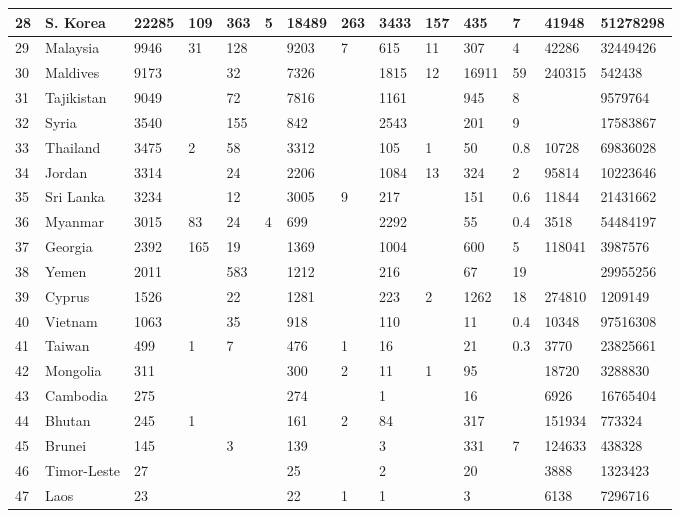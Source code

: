 \begin{landscape}
\begin{footnotesize}
\begin{longtable}{ | l | l | l | l | l | l | l | l | l | l | l | l | l | l | }
	28 & S. Korea & 22285 & 109 & 363 & 5 & 18489 & 263 & 3433 & 157 & 435 & 7 & 41948 & 51278298 \\ \hline
	29 & Malaysia & 9946 & 31 & 128 &  & 9203 & 7 & 615 & 11 & 307 & 4 & 42286 & 32449426 \\ \hline
	30 & Maldives & 9173 &  & 32 &  & 7326 &  & 1815 & 12 & 16911 & 59 & 240315 & 542438 \\ \hline
	31 & Tajikistan & 9049 &  & 72 &  & 7816 &  & 1161 &  & 945 & 8 &  & 9579764 \\ \hline
	32 & Syria & 3540 &  & 155 &  & 842 &  & 2543 &  & 201 & 9 &  & 17583867 \\ \hline
	33 & Thailand & 3475 & 2 & 58 &  & 3312 &  & 105 & 1 & 50 & 0.8 & 10728 & 69836028 \\ \hline
	34 & Jordan & 3314 &  & 24 &  & 2206 &  & 1084 & 13 & 324 & 2 & 95814 & 10223646 \\ \hline
	35 & Sri Lanka & 3234 &  & 12 &  & 3005 & 9 & 217 &  & 151 & 0.6 & 11844 & 21431662 \\ \hline
	36 & Myanmar & 3015 & 83 & 24 & 4 & 699 &  & 2292 &  & 55 & 0.4 & 3518 & 54484197 \\ \hline
	37 & Georgia & 2392 & 165 & 19 &  & 1369 &  & 1004 &  & 600 & 5 & 118041 & 3987576 \\ \hline
	38 & Yemen & 2011 &  & 583 &  & 1212 &  & 216 &  & 67 & 19 &  & 29955256 \\ \hline
	39 & Cyprus & 1526 &  & 22 &  & 1281 &  & 223 & 2 & 1262 & 18 & 274810 & 1209149 \\ \hline
	40 & Vietnam & 1063 &  & 35 &  & 918 &  & 110 &  & 11 & 0.4 & 10348 & 97516308 \\ \hline
	41 & Taiwan & 499 & 1 & 7 &  & 476 & 1 & 16 &  & 21 & 0.3 & 3770 & 23825661 \\ \hline
	42 & Mongolia & 311 &  &  &  & 300 & 2 & 11 & 1 & 95 &  & 18720 & 3288830 \\ \hline
	43 & Cambodia & 275 &  &  &  & 274 &  & 1 &  & 16 &  & 6926 & 16765404 \\ \hline
	44 & Bhutan & 245 & 1 &  &  & 161 & 2 & 84 &  & 317 &  & 151934 & 773324 \\ \hline
	45 & Brunei & 145 &  & 3 &  & 139 &  & 3 &  & 331 & 7 & 124633 & 438328 \\ \hline
	46 & Timor-Leste & 27 &  &  &  & 25 &  & 2 &  & 20 &  & 3888 & 1323423 \\ \hline
	47 & Laos & 23 &  &  &  & 22 & 1 & 1 &  & 3 &  & 6138 & 7296716 \\ \hline
\end{longtable}
\end{footnotesize}
\end{landscape}


